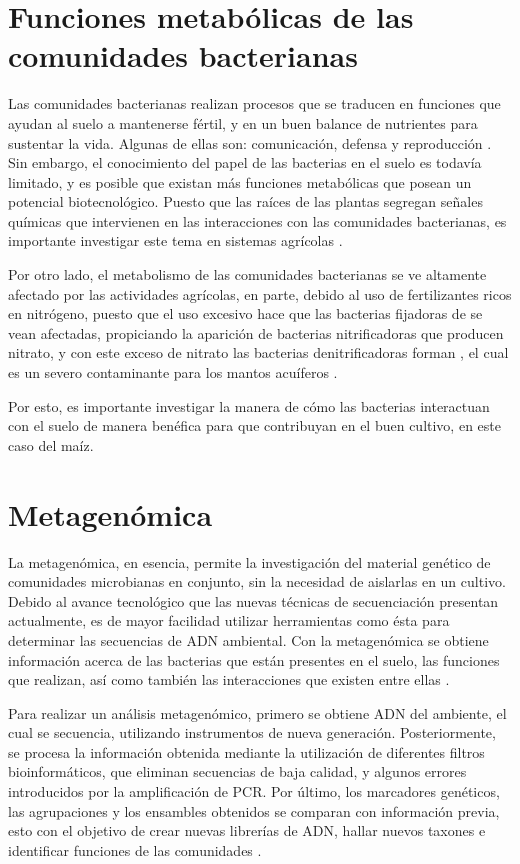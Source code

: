 \documentclass[12pt,letterpaper,oneside]{report}
\begin{document}
\section{Funciones metabólicas de las comunidades bacterianas}
Las comunidades bacterianas realizan procesos que se traducen en funciones que ayudan al suelo a mantenerse fértil, y en un buen balance de nutrientes para sustentar la vida. Algunas de ellas son: comunicación, defensa y reproducción \autocite{Sanchez-de-Prager2012}. Sin embargo, el conocimiento del papel de las bacterias en el suelo es todavía limitado, y es posible que existan más funciones metabólicas que posean un potencial biotecnológico. Puesto que las raíces de las plantas segregan señales químicas que intervienen en las interacciones con las comunidades bacterianas, es importante investigar este tema en sistemas agrícolas \autocite{Petriacq2017}.
\par
Por otro lado, el metabolismo de las comunidades bacterianas se ve altamente afectado por las actividades agrícolas, en parte, debido al uso de fertilizantes ricos en nitrógeno, puesto que el uso excesivo hace que las bacterias fijadoras de  se vean afectadas, propiciando la aparición de bacterias nitrificadoras que producen nitrato, y con este exceso de nitrato las bacterias denitrificadoras forman , el cual es un severo contaminante para los mantos acuíferos \autocite{DeGraaff2019,Vejan2016}.
\par
Por esto, es importante investigar la manera de cómo las bacterias interactuan con el suelo de manera benéfica para que contribuyan en el buen cultivo, en este caso del maíz.
\newpage
\section{Metagenómica}
La metagenómica, en esencia, permite la investigación del material genético de comunidades microbianas en conjunto, sin la necesidad de aislarlas en un cultivo. Debido al avance tecnológico que las nuevas técnicas de secuenciación presentan actualmente, es de mayor facilidad utilizar herramientas como ésta para determinar las secuencias de ADN ambiental. Con la metagenómica se obtiene información acerca de las bacterias que están presentes en el suelo, las funciones que realizan, así como también las interacciones que existen entre ellas \autocite{Hernandez-DeLira2014,Sharpton2014}.
\par
Para realizar un análisis metagenómico, primero se obtiene ADN del ambiente, el cual se secuencia, utilizando instrumentos de nueva generación. Posteriormente, se procesa la información obtenida mediante la utilización de diferentes filtros bioinformáticos, que eliminan secuencias de baja calidad, y algunos errores introducidos por la amplificación de PCR. Por último, los marcadores genéticos, las agrupaciones y los ensambles obtenidos se comparan con información previa, esto con el objetivo de crear nuevas librerías de ADN, hallar nuevos taxones e identificar funciones de las comunidades  \autocite{Daniel2005,Sharpton2014,Xu2014}.
\end{document}
